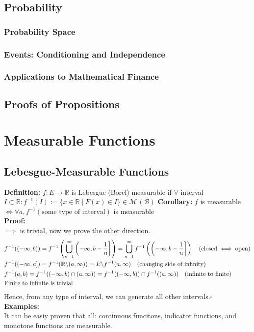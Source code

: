 \documentclass{article}
\newcommand{\R}{\mathbb{R}}
\newcommand{\cupninf}{\bigcup\limits_{n=1}^\infty}
\newcommand{\bcsl}{\symbol{92}}
\newcommand{\0}{{\bf{0}}}
\newcommand{\1}{{\bf{1}}}
\begin{document}
\subsection{Probability}
\subsubsection{Probability Space}
\subsubsection{Events: Conditioning and Independence}
\subsubsection{Applications to Mathematical Finance}
\subsection{Proofs of Propositions}
\clearpage
\section{Measurable Functions}
\subsection{Lebesgue-Measurable Functions}
\textbf{Definition:} $f:E\to\R$ is Lebesgue (Borel) measurable if $\forall$ interval $I\subset\R:f^{-1}(I):=\{x\in\R\mid F(x)\in I\}\in\mathcal{M}\,(\mathcal{B})$
\textbf{Corollary:} $f$ is measurable$\iff\forall a,f^{-1}(\mbox{some type of interval})$ is measurable\\
\textbf{Proof:}\\
$\implies$ is trivial, now we prove the other direction.
\begin{equation}
\begin{split}
    &f^{-1}((-\infty,b))=f^{-1}\left(\cupninf\left(-\infty,b-\frac{1}{n}\right]\right)=\cupninf f^{-1}\left(\left(-\infty,b-\frac{1}{n}\right]\right)\quad(\mbox{closed}\iff\mbox{open})\\
    &f^{-1}((-\infty,a])=f^{-1}(\R\bcsl(a,\infty))=E\bcsl f^{-1}(a,\infty)\quad(\mbox{changing side of infinity})\\
    &f^{-1}(a,b)=f^{-1}((-\infty,b)\cap(a,\infty))=f^{-1}((-\infty,b))\cap f^{-1}((a,\infty))\quad(\mbox{infinite to finite})\\
    &\mbox{Finite to infinite is trivial}\\
\end{split}
\end{equation}
Hence, from any type of interval, we can generate all other intervals.\quad$\square$\\
\textbf{Examples:}\\
It can be easiy proven that all: continuous funcitons, indicator functions, and monotone functions are measurable.
\end{document}
